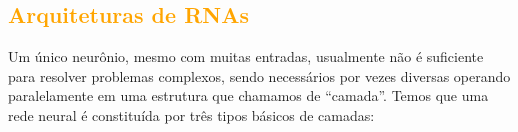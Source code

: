 \documentclass{automatextcc}
\newcommand{\nico}[1]{\textcolor{orange}{#1}}
\begin{document}
\subsection{\nico{Arquiteturas de RNAs}}


Um único neurônio, mesmo com muitas entradas, usualmente não é suficiente para resolver problemas complexos, sendo necessários por vezes diversas operando paralelamente em uma estrutura que chamamos de ``camada''. Temos que uma rede neural é constituída por três tipos básicos de camadas:
\end{document}
